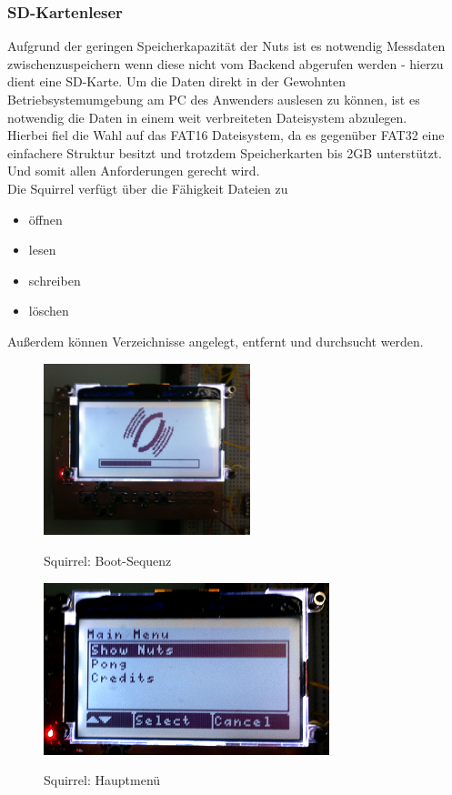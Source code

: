 \documentclass[12pt,a4paper]{article}
\begin{document}
\subsubsection{SD-Kartenleser}
Aufgrund der geringen Speicherkapazität der Nuts ist es notwendig Messdaten zwischenzuspeichern wenn diese nicht vom Backend abgerufen werden - hierzu dient eine SD-Karte.
Um die Daten direkt in der Gewohnten Betriebsystemumgebung am PC des Anwenders auslesen zu können, ist es notwendig die Daten in einem weit verbreiteten Dateisystem abzulegen.\\
Hierbei fiel die Wahl auf das FAT16 Dateisystem, da es gegenüber FAT32 eine einfachere Struktur besitzt und trotzdem Speicherkarten bis 2GB unterstützt. Und somit allen Anforderungen gerecht wird.\\
Die Squirrel verfügt über die Fähigkeit Dateien zu
\begin{itemize} %
\item öffnen
\item lesen
\item schreiben
\item löschen
\end{itemize}
Außerdem können Verzeichnisse angelegt, entfernt und durchsucht werden.\\


\begin{figure}[h]
\includegraphics[height=5cm]{squirrel_shot1.png}
\label{fig:0}
\caption{Squirrel: Boot-Sequenz}
\end{figure}
\begin{figure}[h]
\includegraphics[height=5cm]{squirrel_shot2.png}
\label{fig:1}
\caption{Squirrel: Hauptmenü}
\end{figure}
\end{document}
